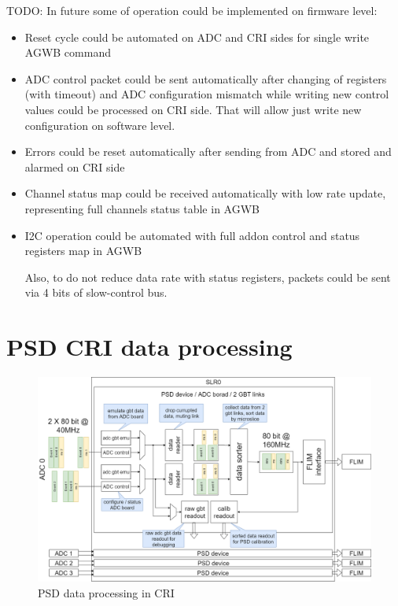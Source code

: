 \documentclass{article}
\begin{document}
TODO: In future some of operation could be implemented on firmware level:
 
\begin{itemize}
\item Reset cycle could be automated on ADC and CRI sides for single write AGWB command
\item ADC control packet could be sent automatically after changing of registers (with timeout) and ADC configuration mismatch while writing new control values could be processed on CRI side. That will allow just write new configuration on software level.
\item Errors could be reset automatically after sending from ADC and stored and alarmed on CRI side
\item Channel status map could be received automatically with low rate update, representing full channels status table in AGWB
\item I2C operation could be automated with full addon control and status registers map in AGWB

Also, to do not reduce data rate with status registers, packets could be sent via 4 bits of slow-control bus.

\end{itemize}



\section{PSD CRI data processing}

\begin{figure}[H]
	\centering 
	\includegraphics[width=1.0\textwidth]{pic_scheme/CRI_data_sort.png}
	\caption{\label{fig:cri-data-process} PSD data processing in CRI}
\end{figure}
\end{document}
